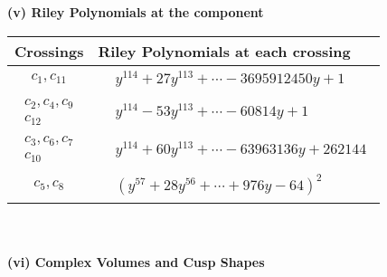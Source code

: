 \documentclass[1p]{elsarticle_modified}
\theoremstyle{definition}
\begin{document}
\newpage\renewcommand{\arraystretch}{1}
\flushleft \textbf{(v) Riley Polynomials at the component}\newline \\
\begin{tabular}{m{50pt}|m{274pt}}
Crossings & \hspace{64pt}Riley Polynomials at each crossing \\
\hline $$\begin{aligned}c_{1},c_{11}\end{aligned}$$&$\begin{aligned}
&y^{114}+27 y^{113}+\cdots-3695912450 y+1
\end{aligned}$\\
\hline $$\begin{aligned}c_{2},c_{4},c_{9}\\c_{12}\end{aligned}$$&$\begin{aligned}
&y^{114}-53 y^{113}+\cdots-60814 y+1
\end{aligned}$\\
\hline $$\begin{aligned}c_{3},c_{6},c_{7}\\c_{10}\end{aligned}$$&$\begin{aligned}
&y^{114}+60 y^{113}+\cdots-63963136 y+262144
\end{aligned}$\\
\hline $$\begin{aligned}c_{5},c_{8}\end{aligned}$$&$\begin{aligned}
&(y^{57}+28 y^{56}+\cdots+976 y-64)^{2}
\end{aligned}$\\
\hline
\end{tabular}\\~\\
\newpage\flushleft \textbf{(vi) Complex Volumes and Cusp Shapes}
\end{document}
